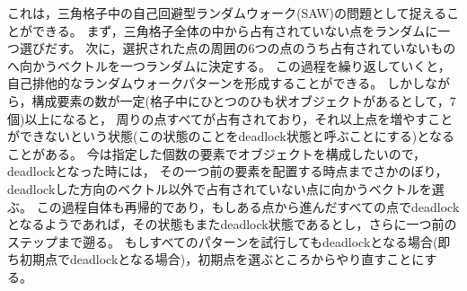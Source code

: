 これは，三角格子中の自己回避型ランダムウォーク(SAW)の問題として捉えることができる。
まず，三角格子全体の中から占有されていない点をランダムに一つ選びだす。
次に，選択された点の周囲の6つの点のうち占有されていないものへ向かうベクトルを一つランダムに決定する。
この過程を繰り返していくと，自己排他的なランダムウォークパターンを形成することができる。
しかしながら，構成要素の数が一定(格子中にひとつのひも状オブジェクトがあるとして，7個)以上になると，
周りの点すべてが占有されており，それ以上点を増やすことができないという状態(この状態のことをdeadlock状態と呼ぶことにする)となることがある。
今は指定した個数の要素でオブジェクトを構成したいので，deadlockとなった時には，
その一つ前の要素を配置する時点までさかのぼり，deadlockした方向のベクトル以外で占有されていない点に向かうベクトルを選ぶ。
この過程自体も再帰的であり，もしある点から進んだすべての点でdeadlockとなるようであれば，その状態もまたdeadlock状態であるとし，さらに一つ前のステップまで遡る。
もしすべてのパターンを試行してもdeadlockとなる場合(即ち初期点でdeadlockとなる場合)，初期点を選ぶところからやり直すことにする。

\subsubsection{}


